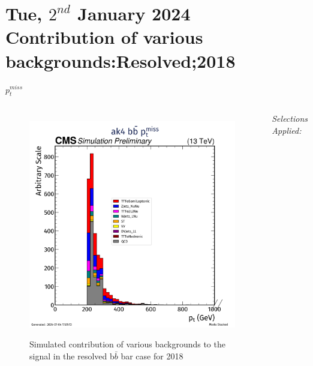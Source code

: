 \documentclass[10pt,xcolor=dvipsnames]{beamer}
\begin{document}

\section[Contribution of various backgrounds:Resolved;2018]{Tue, $2^{nd}$ January 2024 \\ Contribution of various backgrounds:Resolved;2018}



\begin{frame}[fragile]{$p^{miss}_t$ }
  \begin{columns}
    \begin{figure}
      \centering
      \includegraphics[width=1\textwidth]{../Backgrounds/plots/SR_Resolved_Backgrounds_met_pt_hist_Combined.png}
      \label{contribution}
      \caption{Simulated contribution of various backgrounds to the signal in the resolved b$ \bar{b} $ bar case for 2018}
    \end{figure}
    \textit{Selections Applied:} \\

\end{columns}
\end{frame}
\end{document}
